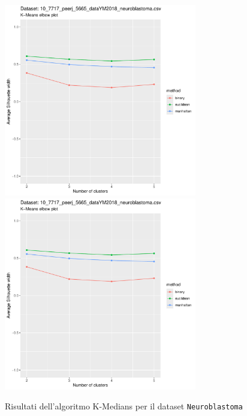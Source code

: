 \documentclass[a4paper, 12pt]{report}
\begin{document}
			\begin{figure}[H]
				\centering
				\includegraphics[width = 0.75\textwidth, height = 0.45\textheight, page = 3]{
					results/results_Neuroblastoma.csv.pdf
				}
				\includegraphics[width = 0.75\textwidth, height = 0.45\textheight, page = 4]{
					results/results_Neuroblastoma.csv.pdf
				}
				\caption{Risultati dell'algoritmo K-Medians per il dataset
				\texttt{Neuroblastoma}}
				\label{fig:kmedians3}
			\end{figure}
\end{document}
